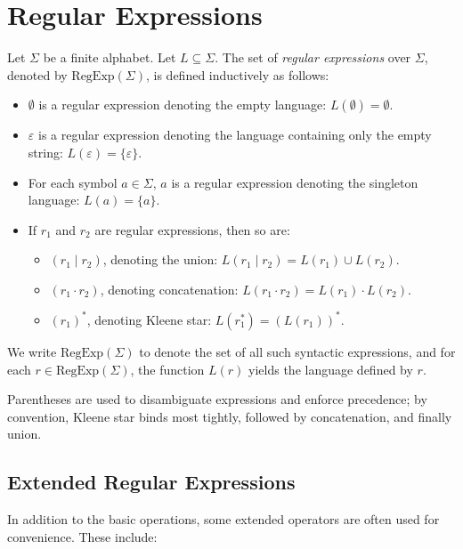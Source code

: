 \section{Regular Expressions}
Let $\Sigma$ be a finite alphabet. Let $L \subseteq \Sigma$. The set of \emph{regular expressions} over $\Sigma$, denoted by $\text{RegExp}(\Sigma)$, is defined inductively as follows:

\begin{itemize}
    \item $\emptyset$ is a regular expression denoting the empty language: $L(\emptyset) = \emptyset$.
    \item $\varepsilon$ is a regular expression denoting the language containing only the empty string: $L(\varepsilon) = \{ \varepsilon \}$.
    \item For each symbol $a \in \Sigma$, $a$ is a regular expression denoting the singleton language: $L(a) = \{ a \}$.
    \item If $r_1$ and $r_2$ are regular expressions, then so are:
    \begin{itemize}
        \item $(r_1 \mid r_2)$, denoting the union: $L(r_1 \mid r_2) = L(r_1) \cup L(r_2)$.
        \item $(r_1 \cdot r_2)$, denoting concatenation: $L(r_1 \cdot r_2) = L(r_1) \cdot L(r_2)$.
        \item $(r_1)^*$, denoting Kleene star: $L(r_1^*) = (L(r_1))^*$.
    \end{itemize}
\end{itemize}
We write $\text{RegExp}(\Sigma)$ to denote the set of all such syntactic expressions, and for each $r \in \text{RegExp}(\Sigma)$, the function $L(r)$ yields the language defined by $r$.

\medskip

Parentheses are used to disambiguate expressions and enforce precedence; by convention, Kleene star binds most tightly, followed by concatenation, and finally union.

\subsection{Extended Regular Expressions}
In addition to the basic operations, some extended operators are often used for convenience. These include:

